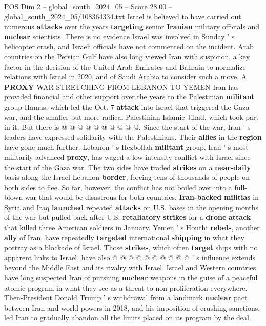 \begin{textsample}{POS Dim 2 – global\_south\_2024\_05 – Score 28.00 – global\_south\_2024\_05/108364334.txt}
Israel is believed to have carried out numerous \textbf{attacks} over the years \textbf{targeting} senior \textbf{Iranian} military officials and \textbf{nuclear} scientists.
There is no evidence Israel was involved in Sunday ' s helicopter crash, and Israeli officials have not commented on the incident.
Arab countries on the Persian Gulf have also long viewed Iran with suspicion, a key factor in the decision of the United Arab Emirates and Bahrain to normalize relations with Israel in 2020, and of Saudi Arabia to consider such a move.
A \textbf{PROXY} WAR STRETCHING FROM LEBANON TO YEMEN Iran has provided financial and other support over the years to the Palestinian \textbf{militant} group Hamas, which led the Oct. 7 \textbf{attack} into Israel that triggered the Gaza war, and the smaller but more radical Palestinian Islamic Jihad, which took part in it.
But there is @ @ @ @ @ @ @ @ @ @.
Since the start of the war, Iran ' s leaders have expressed solidarity with the Palestinians.
Their \textbf{allies} in the \textbf{region} have gone much further.
Lebanon ' s Hezbollah \textbf{militant} group, Iran ' s most militarily advanced \textbf{proxy}, has waged a low-intensity conflict with Israel since the start of the Gaza war.
The two sides have traded \textbf{strikes} on a \textbf{near-daily} basis along the Israel-Lebanon \textbf{border}, forcing tens of thousands of people on both sides to flee.
So far, however, the conflict has not boiled over into a full-blown war that would be disastrous for both countries. \textbf{Iran-backed} \textbf{militias} in Syria and Iraq \textbf{launched} repeated \textbf{attacks} on U.S. bases in the opening months of the war but pulled back after U.S. \textbf{retaliatory} \textbf{strikes} for a \textbf{drone} \textbf{attack} that killed three American soldiers in January.
Yemen ' s Houthi \textbf{rebels}, another \textbf{ally} of Iran, have repeatedly \textbf{targeted} international \textbf{shipping} in what they portray as a blockade of Israel.
Those \textbf{strikes}, which often \textbf{target} ships with no apparent links to Israel, have also @ @ @ @ @ @ @ @ @ @ ' s influence extends beyond the Middle East and its rivalry with Israel.
Israel and Western countries have long suspected Iran of pursuing \textbf{nuclear} weapons in the guise of a peaceful atomic program in what they see as a threat to non-proliferation everywhere.
Then-President Donald Trump ' s withdrawal from a landmark \textbf{nuclear} pact between Iran and world powers in 2018, and his imposition of crushing sanctions, led Iran to gradually abandon all the limits placed on its program by the deal.

\end{textsample}
